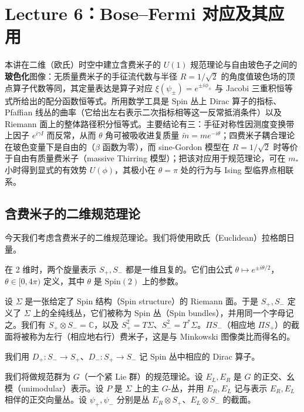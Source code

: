 \section{Lecture 6：Bose–Fermi 对应及其应用}

\begin{keytakeaways}
本讲在二维（欧氏）时空中建立含费米子的 $U(1)$ 规范理论与自由玻色子之间的\textbf{玻色化}图像：无质量费米子的手征流代数与半径 $R=1/\sqrt2$ 的角度值玻色场的顶点算子代数等同，其定量表达是算子对应 $\xi(\psi_\pm)=e^{\pm i\phi_\pm}$ 与 Jacobi 三重积恒等式所给出的配分函数恒等式。所用数学工具是 Spin 丛上 Dirac 算子的指标、Pfaffian 线丛的曲率（它给出左右表示二次指标相等这一反常抵消条件）以及 Riemann 面上的整体路径积分恒等式。主要结论有三：手征对称性因测度变换带上因子 $e^{i\gamma I}$ 而反常，从而 $\theta$ 角可被吸收进复质量 $\tilde m=me^{-i\theta}$；四费米子耦合理论在玻色变量下是自由的（$\beta$ 函数为零），而 sine-Gordon 模型在 $R=1/\sqrt2$ 时等价于自由有质量费米子（massive Thirring 模型）；把该对应用于规范理论，可在 $m_*$ 小时得到显式的有效势 $U(\phi)$，其极小在 $\theta=\pi$ 处的行为与 Ising 型临界点相联系。
\end{keytakeaways}

\subsection{含费米子的二维规范理论}

今天我们考虑含费米子的二维规范理论。我们将使用欧氏（Euclidean）拉格朗日量。

在 2 维时，两个旋量表示 $S_+,S_-$ 都是一维且复的。它们由公式 $\theta\mapsto e^{\pm i\theta/2}$，$\theta\in[0,4\pi)$ 定义，其中 $\theta$ 是 $\mathrm{Spin}(2)$ 上的参数。

设 $\Sigma$ 是一张给定了 Spin 结构（Spin structure）的 Riemann 面。于是 $S_+,S_-$ 定义了 $\Sigma$ 上的全纯线丛，它们被称为 Spin 丛（Spin bundles），并用同一个字母记之。我们有 $S_+\otimes S_-=\mathbb{C}$，以及 $S_+^2=T\Sigma$、$S_-^2=T^*\Sigma$。$\Pi S_-$（相应地 $\Pi S_+$）的截面将被称为左行（相应地右行）费米子，这是与 Minkowski 图像类比而得名的。

我们用 $D_+:S_-\to S_+$、$D_-:S_+\to S_-$ 记 Spin 丛中相应的 Dirac 算子。

我们将做规范群为 $G$（一个紧 Lie 群）的规范理论。设 $E_L,E_R$ 是 $G$ 的正交、幺模（unimodular）表示。设 $P$ 是 $\Sigma$ 上的主 $G$-丛，并用 $E_R,E_L$ 记与表示 $E_R,E_L$ 相伴的正交向量丛。设 $\psi_+,\psi_-$ 分别是丛 $E_R\otimes S_+$、$E_L\otimes S_-$ 的截面。

